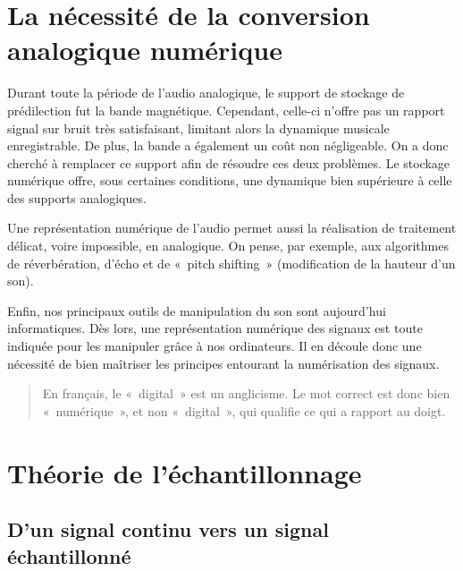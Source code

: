 \documentclass[
]{book}
\begin{document}
\hypertarget{la-nuxe9cessituxe9-de-la-conversion-analogique-numuxe9rique}{%
\section{La nécessité de la conversion analogique numérique}\label{la-nuxe9cessituxe9-de-la-conversion-analogique-numuxe9rique}}

Durant toute la période de l'audio analogique, le support de stockage de prédilection fut la bande magnétique. Cependant, celle-ci n'offre pas un rapport signal sur bruit très satisfaisant, limitant alors la dynamique musicale enregistrable. De plus, la bande a également un coût non négligeable. On a donc cherché à remplacer ce support afin de résoudre ces deux problèmes. Le stockage numérique offre, sous certaines conditions, une dynamique bien supérieure à celle des supports analogiques.

Une représentation numérique de l'audio permet aussi la réalisation de traitement délicat, voire impossible, en analogique. On pense, par exemple, aux algorithmes de réverbération, d'écho et de «~pitch shifting~» (modification de la hauteur d'un son).

Enfin, nos principaux outils de manipulation du son sont aujourd'hui informatiques. Dès lors, une représentation numérique des signaux est toute indiquée pour les manipuler grâce à nos ordinateurs. Il en découle donc une nécessité de bien maîtriser les principes entourant la numérisation des signaux.

\begin{quote}
En français, le «~digital~» est un anglicisme. Le mot correct est donc bien «~numérique~», et non «~digital~», qui qualifie ce qui a rapport au doigt.
\end{quote}

\hypertarget{thuxe9orie-de-luxe9chantillonnage}{%
\section{Théorie de l'échantillonnage}\label{thuxe9orie-de-luxe9chantillonnage}}

\hypertarget{dun-signal-continu-vers-un-signal-uxe9chantillonnuxe9}{%
\subsection{D'un signal continu vers un signal échantillonné}\label{dun-signal-continu-vers-un-signal-uxe9chantillonnuxe9}}
\end{document}
